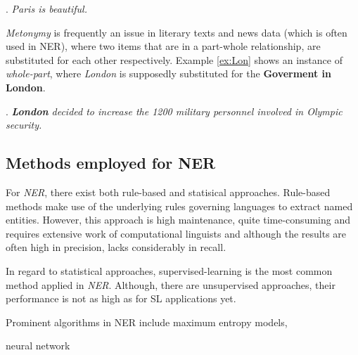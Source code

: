\documentclass[11pt]{article}
\begin{document}
\ex. \emph{Paris is beautiful.} \label{ex:Paris}

\emph{Metonymy} is frequently an issue in literary texts and news data (which is often used in NER), where two items that are in a part-whole
relationship, are substituted for each other respectively. Example \ref{ex:Lon} shows an instance of \emph{whole-part}, where \emph{London} is supposedly substituted
for the \textbf{Goverment in London}. 

\ex. \emph{\textbf{London} decided to increase the 1200 military personnel involved in Olympic security.} \label{ex:Lon}

\subsection{Methods employed for NER}
For \emph{NER}, there exist both rule-based and statisical approaches. 
Rule-based methods make use of the underlying rules governing languages to extract named entities. 
However, this approach is high maintenance, quite time-consuming and requires extensive work of computational linguists \cite{nadeau2007survey}
and although the results are often high in precision, lacks considerably in recall.

In regard to statistical approaches, supervised-learning is the most common method applied in \emph{NER}. Although, there are unsupervised approaches, 
their performance is not as high as for SL applications yet.

Prominent algorithms in NER include maximum entropy models, 

neural network
\end{document}
